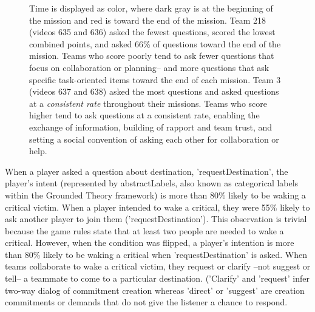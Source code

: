 \begin{figure}
    \centering
    \caption{%
        Time is displayed as color, where dark gray is at the beginning of the
        mission and red is toward the end of the mission. Team 218 (videos 635
        and 636) asked the fewest questions, scored the lowest combined points,
        and asked 66\% of questions toward the end of the mission. Teams who
        score poorly tend to ask fewer questions that focus on collaboration or
        planning-- and more questions that ask specific task-oriented items
        toward the end of each mission. Team 3 (videos 637 and 638) asked the
        most questions and asked questions at a \emph{consistent rate}
        throughout their missions. Teams who score higher tend to ask questions
        at a consistent rate, enabling the exchange of information, building of
        rapport and team trust, and setting a social convention of asking each
        other for collaboration or help.
    }
\end{figure}


When a player asked a question about destination, 'requestDestination', the
player's intent (represented by abstractLabels, also known as categorical
labels within the Grounded Theory framework) is more than 80\% likely to be
waking a critical victim. When a player intended to wake a critical, they were
55\% likely to ask another player to join them ('requestDestination'). This
observation is trivial because the game rules state that at least two people
are needed to wake a critical. However, when the condition was flipped, a
player's intention is more than 80\% likely to be waking a critical when
'requestDestination' is asked. When teams collaborate to wake a critical
victim, they request or clarify --not suggest or tell-- a teammate to come to a
particular destination. ('Clarify' and 'request' infer two-way dialog of
commitment creation whereas 'direct' or 'suggest' are creation commitments or
demands that do not give the listener a chance to respond.

